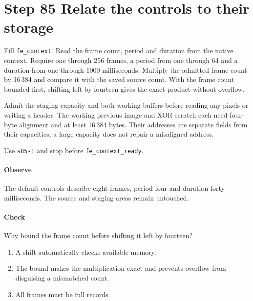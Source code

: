 \section{Step 85 Relate the controls to their storage}
Fill \texttt{fe\_context}. Read the frame count, period and duration from the native context. Require one through 256 frames, a period from one through 64 and a duration from one through 1000 milliseconds. Multiply the admitted frame count by 16\,384 and compare it with the saved source count. With the frame count bounded first, shifting left by fourteen gives the exact product without overflow.

Admit the staging capacity and both working buffers before reading any pixels or writing a header. The working previous image and XOR scratch each need four-byte alignment and at least 16\,384 bytes. Their addresses are separate fields from their capacities; a large capacity does not repair a misaligned address.

Use \texttt{s85-1} and stop before \texttt{fe\_context\_ready}.

\paragraph{Observe} The default controls describe eight frames, period four and duration forty milliseconds. The source and staging areas remain untouched.

\paragraph{Check} Why bound the frame count before shifting it left by fourteen?
\begin{enumerate}[label=\Alph*.]
\item A shift automatically checks available memory.
\item The bound makes the multiplication exact and prevents overflow from disguising a mismatched count.
\item All frames must be full records.
\end{enumerate}
